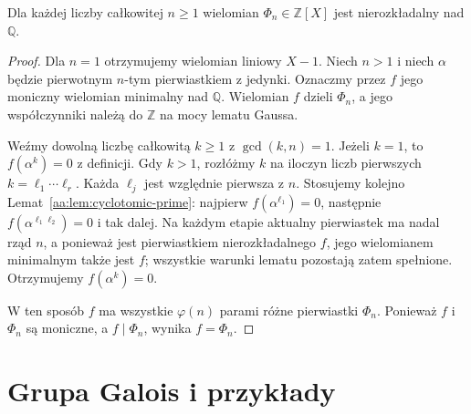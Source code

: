 \begin{twierdzenie}
\label{aa:tw:cyclotomic-irreducible}
Dla każdej liczby całkowitej $n\ge1$ wielomian
$\Phi_n\in\mathbb Z[X]$ jest nierozkładalny nad
$\mathbb Q$.
\end{twierdzenie}
\begin{proof}
Dla $n=1$ otrzymujemy wielomian liniowy $X-1$.
Niech $n>1$ i niech $\alpha$ będzie pierwotnym
$n$-tym pierwiastkiem z jedynki. Oznaczmy przez $f$
jego moniczny wielomian minimalny nad $\mathbb Q$.
Wielomian $f$ dzieli $\Phi_n$, a jego współczynniki
należą do $\mathbb Z$ na mocy lematu Gaussa.

Weźmy dowolną liczbę całkowitą $k\ge1$ z
$\gcd(k,n)=1$. Jeżeli $k=1$, to $f(\alpha^k)=0$
z definicji. Gdy $k>1$, rozłóżmy $k$ na iloczyn liczb
pierwszych $k=\ell_1\cdots\ell_r$. Każda $\ell_j$
jest względnie pierwsza z $n$. Stosujemy kolejno
Lemat~\ref{aa:lem:cyclotomic-prime}: najpierw
$f(\alpha^{\ell_1})=0$, następnie
$f(\alpha^{\ell_1\ell_2})=0$ i tak dalej.
Na każdym etapie aktualny pierwiastek ma nadal
rząd $n$, a ponieważ jest pierwiastkiem nierozkładalnego
$f$, jego wielomianem minimalnym także jest $f$;
wszystkie warunki lematu pozostają zatem spełnione.
Otrzymujemy $f(\alpha^k)=0$.

W ten sposób $f$ ma wszystkie $\varphi(n)$ parami
różne pierwiastki $\Phi_n$. Ponieważ $f$ i $\Phi_n$
są moniczne, a $f\mid\Phi_n$, wynika $f=\Phi_n$.
\end{proof}

\section{Grupa Galois i przykłady}

